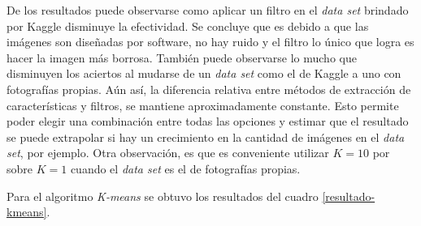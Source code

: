 \documentclass[10pt,a4paper]{article}
\begin{document}
De los resultados puede observarse como aplicar un filtro en el \textit{data set} brindado por Kaggle disminuye la efectividad. Se concluye que es debido a que las imágenes son diseñadas por software, no hay ruido y el filtro lo único que logra es hacer la imagen más borrosa. También puede observarse lo mucho que disminuyen los aciertos al mudarse de un \textit{data set} como el de Kaggle a uno con fotografías propias. Aún así, la diferencia relativa entre métodos de extracción de características y filtros, se mantiene aproximadamente constante. Esto permite poder elegir una combinación entre todas las opciones y estimar que el resultado se puede extrapolar si hay un crecimiento en la cantidad de imágenes en el \textit{data set}, por ejemplo. Otra observación, es que es conveniente utilizar $K=10$ por sobre $K=1$ cuando el \textit{data set} es el de fotografías propias. 

Para el algoritmo \textit{K-means} se obtuvo los resultados del cuadro \ref{resultado-kmeans}.
\end{document}
